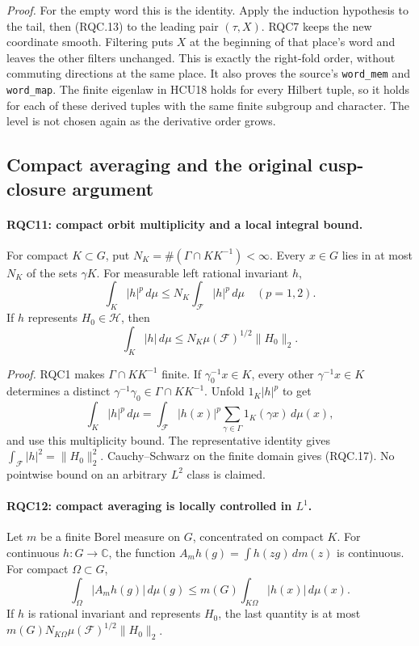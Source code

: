 \documentclass[11pt,a4paper]{article}
\numberwithin{equation}{section}
\theoremstyle{remark}\newtheorem{remark}[theorem]{Remark}
\begin{document}
\emph{Proof.}
For the empty word this is the identity.  Apply the induction
hypothesis to the tail, then (RQC.13) to the leading pair
\((\tau,X)\).  RQC7 keeps the new coordinate smooth.
Filtering puts \(X\) at the beginning of that place's word and
leaves the other filters unchanged.  This is exactly the
right-fold order, without commuting directions at the same place.
It also proves the source's \texttt{word\_mem} and
\texttt{word\_map}.  The finite eigenlaw in HCU18 holds for every
Hilbert tuple, so it holds for each of these derived tuples with
the same finite subgroup and character.  The level is not chosen
again as the derivative order grows.

\subsection{Compact averaging and the original cusp-closure argument}

\paragraph{RQC11: compact orbit multiplicity and a local integral bound.}
\label{claim:RQC11}
For compact \(K\subset G\), put
\(N_K=\#(\Gamma\cap KK^{-1})<\infty\).
Every \(x\in G\) lies in at most \(N_K\) of the sets \(\gamma K\).
For measurable left rational invariant \(h\),
\[
 \int_K|h|^p\,d\mu\le N_K\int_{\mathcal F}|h|^p\,d\mu
 \quad(p=1,2).
 \tag{RQC.16}
\]
If \(h\) represents \(H_0\in\mathcal H\), then
\[
 \int_K|h|\,d\mu
 \le N_K\mu(\mathcal F)^{1/2}\|H_0\|_2.
 \tag{RQC.17}
\]

\emph{Proof.}
RQC1 makes \(\Gamma\cap KK^{-1}\) finite.
If \(\gamma_0^{-1}x\in K\), every other
\(\gamma^{-1}x\in K\) determines a distinct
\(\gamma^{-1}\gamma_0\in\Gamma\cap KK^{-1}\).
Unfold \(1_K|h|^p\) to get
\[
 \int_K|h|^p\,d\mu
 =\int_{\mathcal F}|h(x)|^p
       \sum_{\gamma\in\Gamma}1_K(\gamma x)\,d\mu(x),
\]
and use this multiplicity bound.  The representative identity
gives \(\int_{\mathcal F}|h|^2=\|H_0\|_2^2\).
Cauchy--Schwarz on the finite domain gives (RQC.17).
No pointwise bound on an arbitrary \(L^2\) class is claimed.

\paragraph{RQC12: compact averaging is locally controlled in \(L^1\).}
\label{claim:RQC12}
Let \(m\) be a finite Borel measure on \(G\), concentrated on
compact \(K\).  For continuous \(h:G\to\mathbb C\), the function
\(A_mh(g)=\int h(zg)\,dm(z)\) is continuous.  For compact
\(\Omega\subset G\),
\[
 \int_\Omega|A_mh(g)|\,d\mu(g)
 \le m(G)\int_{K\Omega}|h(x)|\,d\mu(x).
 \tag{RQC.18}
\]
If \(h\) is rational invariant and represents \(H_0\), the last
quantity is at most
\(m(G)N_{K\Omega}\mu(\mathcal F)^{1/2}\|H_0\|_2\).
\end{document}
